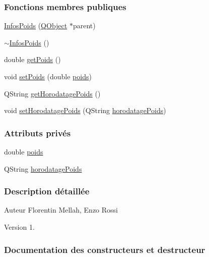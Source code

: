 \subsubsection*{Fonctions membres publiques}
\begin{DoxyCompactItemize}
\item 
\hyperlink{class_infos_poids_a25a9086e75ce6c7e8391c3908c9324c0}{Infos\+Poids} (\hyperlink{class_q_object}{Q\+Object} $\ast$parent)
\item 
\hyperlink{class_infos_poids_a14038b5639c79ff6558c91aec12013d1}{$\sim$\+Infos\+Poids} ()
\item 
double \hyperlink{class_infos_poids_a902fb0222d3b2fa396987daed57377d2}{get\+Poids} ()
\item 
void \hyperlink{class_infos_poids_a23bb9c5939d0ee5cab0ecf821cdc6779}{set\+Poids} (double \hyperlink{class_infos_poids_ac5faebb99bd0f87f96b442f10349cbd8}{poids})
\item 
Q\+String \hyperlink{class_infos_poids_a9bd9ffa1a5fcd75a8d75bd7330727620}{get\+Horodatage\+Poids} ()
\item 
void \hyperlink{class_infos_poids_add0957f341ade104a4521ead7562dff8}{set\+Horodatage\+Poids} (Q\+String \hyperlink{class_infos_poids_a6cff463552adfdde9430073a87878494}{horodatage\+Poids})
\end{DoxyCompactItemize}
\subsubsection*{Attributs privés}
\begin{DoxyCompactItemize}
\item 
double \hyperlink{class_infos_poids_ac5faebb99bd0f87f96b442f10349cbd8}{poids}
\item 
Q\+String \hyperlink{class_infos_poids_a6cff463552adfdde9430073a87878494}{horodatage\+Poids}
\end{DoxyCompactItemize}


\subsubsection{Description détaillée}
\begin{DoxyAuthor}{Auteur}
Florentin Mellah, Enzo Rossi
\end{DoxyAuthor}
\begin{DoxyVersion}{Version}
1. 
\end{DoxyVersion}


\subsubsection{Documentation des constructeurs et destructeur}
\mbox{\label{class_infos_poids_a25a9086e75ce6c7e8391c3908c9324c0}} 
